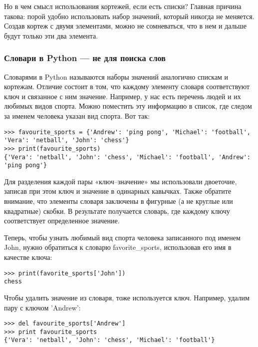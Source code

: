 \documentclass[11pt]{article}
\begin{document}
Но в чем смысл использования кортежей, если есть списки? Главная причина
такова: порой удобно использовать набор значений, который никогда не
меняется. Создав кортеж с двумя элементами, можно не сомневаться, что в
нем и дальше будут только эти два элемента.

\subsubsection{Словари в Python --- не для поиска
слов}\label{ux441ux43bux43eux432ux430ux440ux438-ux432-python-ux43dux435-ux434ux43bux44f-ux43fux43eux438ux441ux43aux430-ux441ux43bux43eux432}

Словарями в Python называются наборы значений аналогично спискам и
кортежам. Отличие состоит в том, что каждому элементу словаря
соответствуют ключ и связанное с ним значение. Например, у нас есть
перечень людей и их любимых видов спорта. Можно поместить эту информацию
в список, где следом за именем человека указан вид спорта. Вот так:

\begin{verbatim}
>>> favourite_sports = {'Andrew': 'ping pong', 'Michael': 'football', 'Vera': 'netball', 'John': 'chess'}
>>> print(favourite_sports)
{'Vera': 'netball', 'John': 'chess', 'Michael': 'football', 'Andrew': 'ping pong'}
\end{verbatim}

Для разделения каждой пары «ключ--значение» мы использовали двоеточие,
записав при этом ключ и значение в одинарных кавычках. Также обратите
внимание, что элементы словаря заключены в фигурные (а не круглые или
квадратные) скобки. В результате получается словарь, где каждому ключу
соответствует определенное значение.

Теперь, чтобы узнать любимый вид спорта человека записанного под именем
John, нужно обратиться к словарю favorite\_sports, использовав его имя в
качестве ключа:

\begin{verbatim}
>>> print(favorite_sports['John'])
chess
\end{verbatim}

Чтобы удалить значение из словаря, тоже используется ключ. Например,
удалим пару с ключом 'Andrew':

\begin{verbatim}
>>> del favourite_sports['Andrew']
>>> print favourite_sports
{'Vera': 'netball', 'John': 'chess', 'Michael': 'football'}
\end{verbatim}
\end{document}
